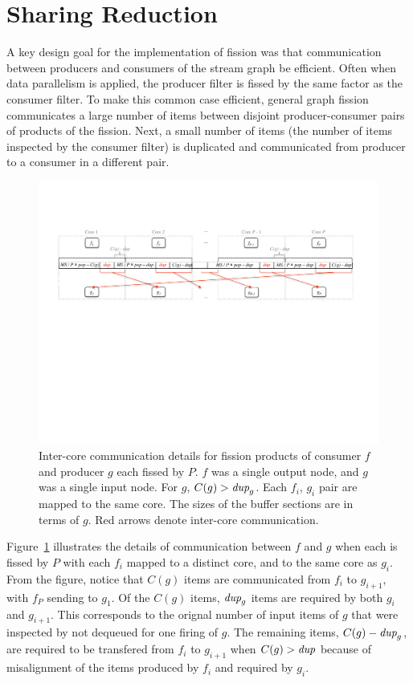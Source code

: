 \section{Sharing Reduction}

A key design goal for the implementation of fission was that
communication between producers and consumers of the stream graph be
efficient.  Often when data parallelism is applied, the producer
filter is fissed by the same factor as the consumer filter.  To make
this common case efficient, general graph fission communicates a large
number of items between disjoint producer-consumer pairs of products
of the fission.  Next, a small number of items (the number of items
inspected by the consumer filter) is duplicated and communicated from
producer to a consumer in a different pair.

\begin{figure}[t]
\centering
\includegraphics[width=6in]{figures/remaining-dup-case.pdf}
\caption[Extra inter-core communication when $C(g) > \mt{dup}_g$.]
{Inter-core communication details for fission products of consumer $f$
  and producer $g$ each fissed by $P$.  $f$ was a single output node,
  and $g$ was a single input node.  For $g$, $C(g) > \mt{dup}_g$.
  Each $f_i$, $g_i$ pair are mapped to the same core.  The sizes of
  the buffer sections are in terms of $g$. Red arrows denote
  inter-core communication.  \label{fig:remaining-dup}}
\end{figure}

Figure~\ref{fig:remaining-dup} illustrates the details of
communication between $f$ and $g$ when each is fissed by $P$ with each
$f_i$ mapped to a distinct core, and to the same core as $g_i$.  From
the figure, notice that $C(g)$ items are communicated from $f_i$ to
$g_{i+ 1}$, with $f_P$ sending to $g_1$.  Of the $C(g)$ items,
$\mbox{\it dup}_g$ items are required by both $g_i$ and $g_{i+1}$.  This
corresponds to the orignal number of input items of $g$ that were
inspected by not dequeued for one firing of $g$.  The remaining items,
$C(g) - \mbox{\it dup}_g$, are required to be transfered from $f_i$ to
$g_{i+1}$ when $C(g) > \mbox{\it dup}$ because of misalignment of the items
produced by $f_i$ and required by $g_i$.

